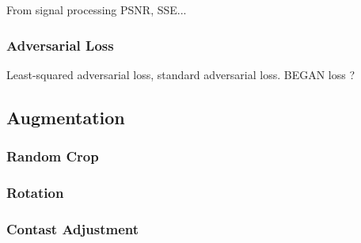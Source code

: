 From signal processing PSNR, SSE...

\subsubsection{Adversarial Loss}

Least-squared adversarial loss, standard adversarial loss. BEGAN loss ?


\subsection{Augmentation}

\subsubsection{Random Crop}
\subsubsection{Rotation}
\subsubsection{Contast Adjustment}

